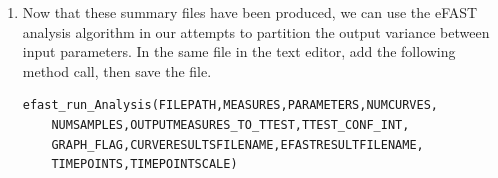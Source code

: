 \documentclass[a4paper,11pt]{article}
\begin{document}
\begin{enumerate}
If you are using Windows, open R and type the following into the R Command Prompt (where [\textit{path to directory} is the full path to where eFAST\_Analysis.R is saved]:

\begin{verbatim}
source("C:\[\textit{path to directory}]\eFAST_Analysis.R")
\end{verbatim}

Navigate through the folder structure and open one of the summary files.  You will see there are 65 rows of data, one for each of the parameter sample sets. You will then note there are 14 different columns, two for each parameter of interest (as there are two output measures).  Make yourself familiar with the format of the file produced. This will help when applying the toolkit to other simulations.

\item Now that these summary files have been produced, we can use the eFAST analysis algorithm in our attempts to partition the output variance between input parameters. In the same file in the text editor, add the following method call, then save the file.

\begin{verbatim}
efast_run_Analysis(FILEPATH,MEASURES,PARAMETERS,NUMCURVES,
	NUMSAMPLES,OUTPUTMEASURES_TO_TTEST,TTEST_CONF_INT,
	GRAPH_FLAG,CURVERESULTSFILENAME,EFASTRESULTFILENAME,
	TIMEPOINTS,TIMEPOINTSCALE)
\end{verbatim}


\end{enumerate}
\end{document}
